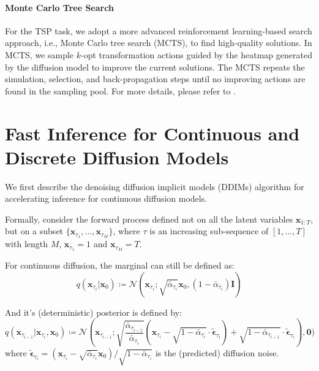 \paragraph{Monte Carlo Tree Search} For the TSP task, we adopt a more advanced reinforcement learning-based search approach, i.e., Monte Carlo tree search (MCTS), to find high-quality solutions. In MCTS, we sample $k$-opt transformation actions guided by the heatmap generated by the diffusion model to improve the current solutions. The MCTS repeats the simulation, selection, and back-propagation steps until no improving actions are found in the sampling pool. For more details, please refer to \citep{fu2021generalize}.




\section{Fast Inference for Continuous and Discrete Diffusion Models} \label{app:ddim}

We first describe the denoising diffusion implicit models (DDIMs) \citep{song2021denoising} algorithm for accelerating inference for continuous diffusion models.

Formally, consider the forward process  defined not  on all the latent variables $\mathbf{x}_{1:T}$, but on a subset $\{\mathbf{x}_{\tau_1}, \dots, \mathbf{x}_{\tau_M}\}$, where $\tau$ is an increasing sub-sequence of $[1, \dots, T]$ with length $M$, $\mathbf{x}_{\tau_1} = 1$ and $\mathbf{x}_{\tau_M} = T$.

For continuous diffusion, the marginal can still be defined as:
\begin{equation}
    q(\mathbf{x}_{\tau_{i}} | \mathbf{x}_{0}) \coloneqq
    \mathcal{N}(\mathbf{x}_{\tau_i}; \sqrt{\bar{\alpha}_{\tau_i}} \mathbf{x}_0, (1 - \bar{\alpha}_{\tau_i}) \mathbf{I})
\end{equation}

And it's (deterministic) posterior is defined by:
\begin{equation}
    q(\mathbf{x}_{\tau_{i-1}} | \mathbf{x}_{\tau_{i}}, \mathbf{x}_{0}) \coloneqq
     \mathcal{N}(\mathbf{x}_{\tau_{i-1}}; 
    \sqrt{\frac{\bar{\alpha}_{\tau_{i-1}}}{\bar{\alpha}_{\tau_i}}} 
    \left(\mathbf{x}_{\tau_{i}} - \sqrt{1 - \bar{\alpha}_{\tau_i}} \cdot \widetilde{\boldsymbol{\epsilon}}_{\tau_i} \right) + \sqrt{1 - \bar{\alpha}_{\tau_{i-1}}} \cdot \widetilde{\boldsymbol{\epsilon}}_{\tau_i} )
    , \mathbf{0})
\end{equation}
where $\widetilde{\boldsymbol{\epsilon}}_{\tau_i} = {(\mathbf{x}_{\tau_i} - \sqrt{\bar{\alpha}_{\tau_i}} \mathbf{x}_0) / \sqrt{1 - \bar{\alpha}_{\tau_i}}}$ is the (predicted) diffusion noise.

